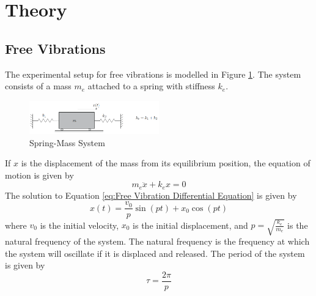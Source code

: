 \section{Theory}
\subsection{Free Vibrations}
The experimental setup for free vibrations is modelled in Figure \ref{fig:Spring-Mass-Damper System}. The system consists of a mass $m_e$ attached to a spring with stiffness $k_e$. 
\begin{figure}[H]
    \centering
    \includegraphics[width=0.5\textwidth]{Sections/Figures/theory spring mass.png}
    \caption{Spring-Mass System}
    \label{fig:Spring-Mass-Damper System}
\end{figure}
If $x$ is the displacement of the mass from its equilibrium position, the equation of motion is given by
\begin{equation}
    m_e\ddot{x} + k_ex = 0 \label{eq:Free Vibration Differential Equation}
\end{equation}
The solution to Equation \ref{eq:Free Vibration Differential Equation} is given by
\begin{equation}
    x(t) = \frac{v_0}{p}\sin(pt) + x_0\cos(pt) \label{eq:Free Vibration Solution}
\end{equation}
where $v_0$ is the initial velocity, $x_0$ is the initial displacement, and $p = \sqrt{\frac{k_e}{m_e}}$ is the natural frequency of the system. The natural frequency is the frequency at which the system will oscillate if it is displaced and released. The period of the system is given by
\begin{equation}
    \tau = \frac{2\pi}{p} \label{eq:Free Vibration Period}
\end{equation}

